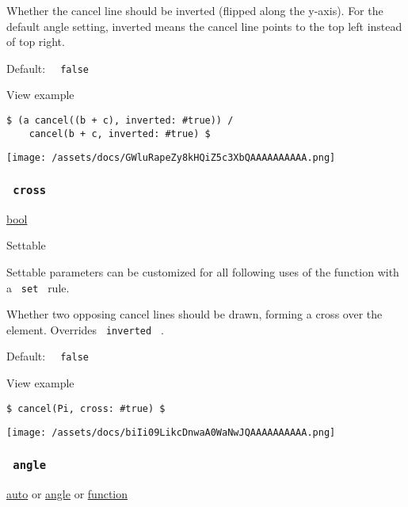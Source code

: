 Whether the cancel line should be inverted (flipped along the y-axis).
For the default angle setting, inverted means the cancel line points to
the top left instead of top right.

Default: \texttt{\ }{\texttt{\ false\ }}\texttt{\ }


View example

\begin{verbatim}
$ (a cancel((b + c), inverted: #true)) /
    cancel(b + c, inverted: #true) $
\end{verbatim}

\texttt{[image: /assets/docs/GWluRapeZy8kHQiZ5c3XbQAAAAAAAAAA.png]}

\subsubsection{\texorpdfstring{\texttt{\ cross\ }}{ cross }}\label{parameters-cross}

\href{/docs/reference/foundations/bool/}{bool}

{{ Settable }}

\label{parameters-cross-settable-tooltip}
Settable parameters can be customized for all following uses of the
function with a \texttt{\ set\ } rule.

Whether two opposing cancel lines should be drawn, forming a cross over
the element. Overrides \texttt{\ inverted\ } .

Default: \texttt{\ }{\texttt{\ false\ }}\texttt{\ }


View example

\begin{verbatim}
$ cancel(Pi, cross: #true) $
\end{verbatim}

\texttt{[image: /assets/docs/biIi09LikcDnwaA0WaNwJQAAAAAAAAAA.png]}

\subsubsection{\texorpdfstring{\texttt{\ angle\ }}{ angle }}\label{parameters-angle}

\href{/docs/reference/foundations/auto/}{auto} {or}
\href{/docs/reference/layout/angle/}{angle} {or}
\href{/docs/reference/foundations/function/}{function}

